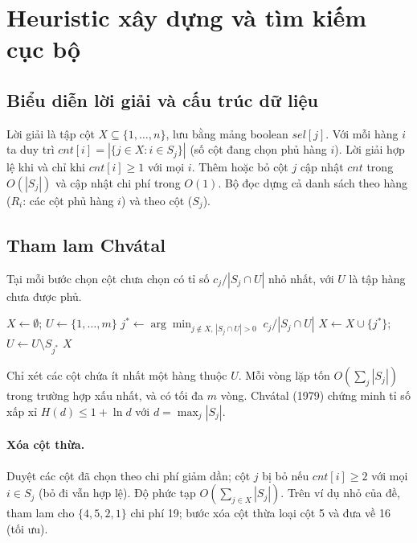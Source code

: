 
\section{Heuristic xây dựng và tìm kiếm cục bộ}

\subsection{Biểu diễn lời giải và cấu trúc dữ liệu}
Lời giải là tập cột $X\subseteq\{1,\dots,n\}$, lưu bằng mảng boolean $sel[j]$. Với mỗi hàng $i$ ta duy trì
$cnt[i]=|\{j\in X: i\in S_j\}|$ (số cột đang chọn phủ hàng $i$). Lời giải hợp lệ khi và chỉ khi $cnt[i]\ge 1$ với mọi $i$.
Thêm hoặc bỏ cột $j$ cập nhật $cnt$ trong $O(|S_j|)$ và cập nhật chi phí trong $O(1)$.
Bộ đọc dựng cả danh sách theo hàng ($R_i$: các cột phủ hàng $i$) và theo cột ($S_j$).

\subsection{Tham lam Chvátal}
Tại mỗi bước chọn cột chưa chọn có tỉ số $c_j/|S_j\cap U|$ nhỏ nhất, với $U$ là tập hàng chưa được phủ.

\begin{algorithm}[htbp]
\caption{Tham lam Chvátal}
\begin{algorithmic}[1]
\State $X\gets\emptyset$; $U\gets\{1,\dots,m\}$
  \State $j^*\gets\arg\min_{j\notin X,\,|S_j\cap U|>0}\; c_j/|S_j\cap U|$
  \State $X\gets X\cup\{j^*\}$; $U\gets U\setminus S_{j^*}$
\EndWhile
\State {}
\State \Return $X$
\end{algorithmic}
\end{algorithm}

Chỉ xét các cột chứa ít nhất một hàng thuộc $U$. Mỗi vòng lặp tốn $O(\sum_{j}|S_j|)$ trong trường hợp xấu nhất, và có tối đa $m$ vòng.
Chvátal (1979) chứng minh tỉ số xấp xỉ $H(d)\le 1+\ln d$ với $d=\max_j|S_j|$.

\paragraph{Xóa cột thừa.} Duyệt các cột đã chọn theo chi phí giảm dần; cột $j$ bị bỏ nếu $cnt[i]\ge 2$ với mọi $i\in S_j$
(bỏ đi vẫn hợp lệ). Độ phức tạp $O(\sum_{j\in X}|S_j|)$.
Trên ví dụ nhỏ của đề, tham lam cho $\{4,5,2,1\}$ chi phí 19; bước xóa cột thừa loại cột 5 và đưa về 16 (tối ưu).

